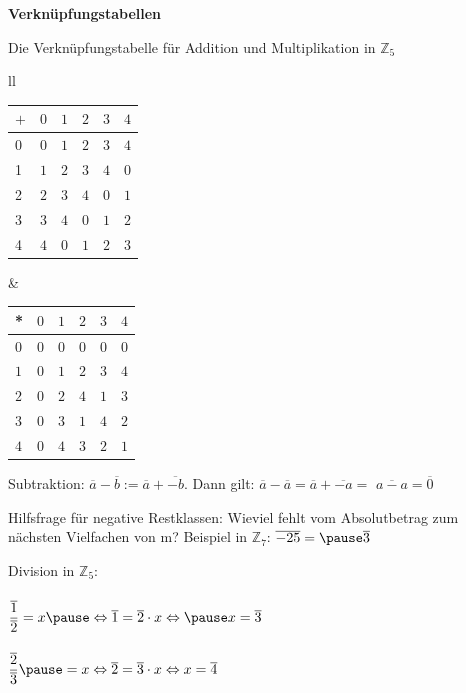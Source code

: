 \begin{frame}[fragile]

\textbf{Verknüpfungstabellen}

Die Verknüpfungstabelle für Addition und Multiplikation in $\mathbb{Z}_5$

\begin{tabular}{ll}
\begin{tabular}{l|lllll}
$+$ & $0$ & $1$ & $2$ & $3$ & $4$ \\ \hline
0 & $0$ & $1$ & $2$ & $3$ & $4$ \\
1 & $1$ & $2$ & $3$ & $4$ & $0$ \\
2 & $2$ & $3$ & $4$ & $0$ & $1$ \\
3 & $3$ & $4$ & $0$ & $1$ & $2$ \\
4 & $4$ & $0$ & $1$ & $2$ & $3$ \\
\end{tabular}
&\quad
\begin{tabular}{llllll}
* & $0$ & $1$ & $2$ & $3$ & $4$ \\ \hline
$0$ & $0$ & $0$ & $0$ & $0$ & $0$ \\
$1$ & $0$ & $1$ & $2$ & $3$ & $4$ \\
$2$ & $0$ & $2$ & $4$ & $1$ & $3$ \\
$3$ & $0$ & $3$ & $1$ & $4$ & $2$ \\
$4$ & $0$ & $4$ & $3$ & $2$ & $1$ \\
\end{tabular}
\end{tabular}

\end{frame}

\begin{frame}[fragile]
Subtraktion: $\overline{a} - \overline{b} := \overline{a}+ \overline{-b}$. Dann gilt: $\overline{a} - \overline{a} = \overline{a}+ \overline{-a}=$ 
$\overline{a-a} = \overline{0}$ \pause

Hilfsfrage für negative Restklassen: Wieviel fehlt vom Absolutbetrag zum nächsten Vielfachen von m? \quad
Beispiel in  $\mathbb{Z}_7$: $\overline{-25}= \pause \overline{3}$ \pause

Division in $\mathbb{Z}_5:$ \\~\\
$ \dfrac{\overline{1}}{\overline{2}} = x \pause \Leftrightarrow \overline{1} = \overline{2} \cdot x  \Leftrightarrow \pause x= \overline{3}$ \pause
\\~\\
$ \dfrac{\overline{2}}{\overline{3}} \pause = x \Leftrightarrow \overline{2} = \overline{3} \cdot x  \Leftrightarrow x= \overline{4}$ 

\end{frame}

